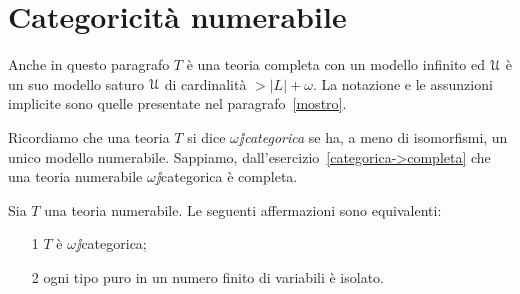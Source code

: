 \section{Categoricit\`a numerabile}

Anche in questo paragrafo $T$ \`e una teoria completa con un modello infinito ed $\EuScript U$ \`e un suo modello saturo $\EuScript U$ di cardinalit\`a $>|L|+\omega$. La notazione e le assunzioni implicite sono quelle presentate nel paragrafo~\ref{mostro}.

Ricordiamo che una teoria $T$ si dice \emph{$\omega\jj$categorica\/} se ha, a meno di isomorfismi, un unico modello numerabile. Sappiamo, dall'esercizio~\ref{categorica->completa} che una teoria numerabile $\omega\jj$categorica \`e completa.

\begin{theorem} Sia $T$ una teoria numerabile. Le seguenti affermazioni sono equivalenti:
\begin{itemize}
\item[1] $T$ \`e $\omega\jj$categorica;
\item[2] ogni tipo puro in un numero finito di variabili \`e isolato.
\end{itemize}
\end{theorem}

